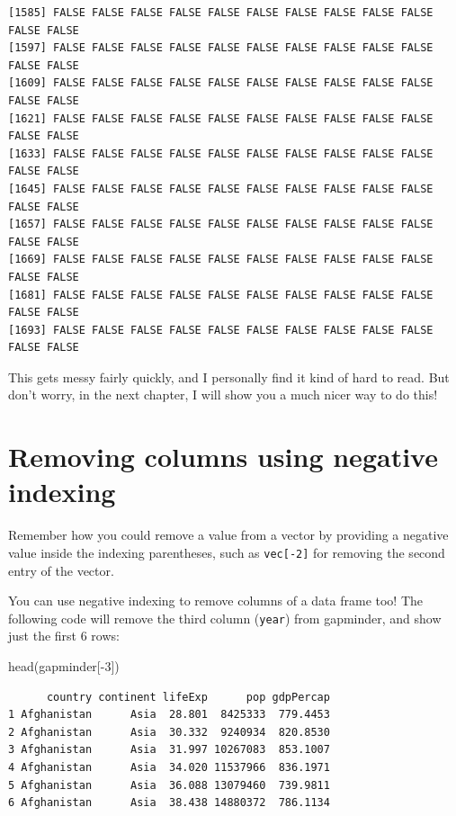 \documentclass[
  letterpaper,
  DIV=11,
  numbers=noendperiod]{scrreprt}
\newenvironment{Shaded}{\begin{snugshade}}{\end{snugshade}}
\newcommand{\DecValTok}[1]{\textcolor[rgb]{0.68,0.00,0.00}{#1}}
\newcommand{\FunctionTok}[1]{\textcolor[rgb]{0.28,0.35,0.67}{#1}}
\newcommand{\NormalTok}[1]{\textcolor[rgb]{0.00,0.23,0.31}{#1}}
\newcommand{\SpecialCharTok}[1]{\textcolor[rgb]{0.37,0.37,0.37}{#1}}
\begin{document}
\begin{verbatim}
[1585] FALSE FALSE FALSE FALSE FALSE FALSE FALSE FALSE FALSE FALSE FALSE FALSE
[1597] FALSE FALSE FALSE FALSE FALSE FALSE FALSE FALSE FALSE FALSE FALSE FALSE
[1609] FALSE FALSE FALSE FALSE FALSE FALSE FALSE FALSE FALSE FALSE FALSE FALSE
[1621] FALSE FALSE FALSE FALSE FALSE FALSE FALSE FALSE FALSE FALSE FALSE FALSE
[1633] FALSE FALSE FALSE FALSE FALSE FALSE FALSE FALSE FALSE FALSE FALSE FALSE
[1645] FALSE FALSE FALSE FALSE FALSE FALSE FALSE FALSE FALSE FALSE FALSE FALSE
[1657] FALSE FALSE FALSE FALSE FALSE FALSE FALSE FALSE FALSE FALSE FALSE FALSE
[1669] FALSE FALSE FALSE FALSE FALSE FALSE FALSE FALSE FALSE FALSE FALSE FALSE
[1681] FALSE FALSE FALSE FALSE FALSE FALSE FALSE FALSE FALSE FALSE FALSE FALSE
[1693] FALSE FALSE FALSE FALSE FALSE FALSE FALSE FALSE FALSE FALSE FALSE FALSE
\end{verbatim}

This gets messy fairly quickly, and I personally find it kind of hard to
read. But don't worry, in the next chapter, I will show you a much nicer
way to do this!

\section{Removing columns using negative
indexing}\label{removing-columns-using-negative-indexing}

Remember how you could remove a value from a vector by providing a
negative value inside the indexing parentheses, such as
\texttt{vec{[}-2{]}} for removing the second entry of the vector.

You can use negative indexing to remove columns of a data frame too! The
following code will remove the third column (\texttt{year}) from
gapminder, and show just the first 6 rows:

\begin{Shaded}
\begin{Highlighting}[]
\FunctionTok{head}\NormalTok{(gapminder[}\SpecialCharTok{{-}}\DecValTok{3}\NormalTok{])}
\end{Highlighting}
\end{Shaded}

\begin{verbatim}
      country continent lifeExp      pop gdpPercap
1 Afghanistan      Asia  28.801  8425333  779.4453
2 Afghanistan      Asia  30.332  9240934  820.8530
3 Afghanistan      Asia  31.997 10267083  853.1007
4 Afghanistan      Asia  34.020 11537966  836.1971
5 Afghanistan      Asia  36.088 13079460  739.9811
6 Afghanistan      Asia  38.438 14880372  786.1134
\end{verbatim}
\end{document}
